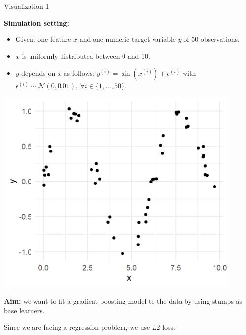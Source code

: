 \begin{vbframe}{Visualization 1}
\begin{footnotesize}
\textbf{Simulation setting:}
\begin{itemize}
\item Given: one feature $x$ and one numeric target variable $y$ of 50 observations.
\item $x$ is uniformly distributed between 0 and 10.
\item $y$ depends on $x$ as follows: $y^{(i)} = \sin{(x^{(i)})} + \epsilon^{(i)}$ with $\epsilon^{(i)} \sim \mathcal{N}(0, 0.01)$, $\forall i \in \{1, \dots, 50\}$.
\end{itemize}

\vfill

\begin{minipage}[c]{0.55\textwidth}
  \vspace{0pt}%
  \includegraphics[width = 0.9\textwidth]{figure/gbm_anim_data.png}
\end{minipage}%
\begin{minipage}[c]{0.02\textwidth}
  \phantom{foo}
\end{minipage}%
\begin{minipage}[c]{0.4\textwidth}
  \vspace{0pt}%
  \raggedright
  \textbf{Aim:} we want to fit a gradient boosting model to the data by using 
  stumps as base learners.
  
  \lz
  Since we are facing a regression problem, we use $L2$ loss.
\end{minipage}%

\framebreak


\end{footnotesize}
\end{vbframe}
